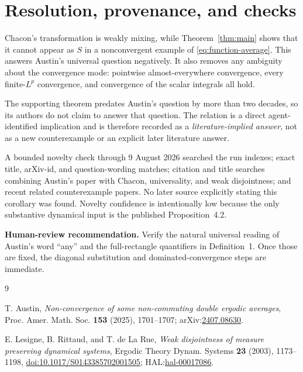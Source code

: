 \documentclass[11pt]{article}
\begin{document}
\section{Resolution, provenance, and checks}

Chacon's transformation is weakly mixing, while Theorem~\ref{thm:main} shows
that it cannot appear as $S$ in a nonconvergent example of
\eqref{eq:function-average}.  This answers Austin's universal question
negatively.  It also removes any ambiguity about the convergence mode:
pointwise almost-everywhere convergence, every finite-$L^p$ convergence, and
convergence of the scalar integrals all hold.

The supporting theorem predates Austin's question by more than two decades,
so its authors do not claim to answer that question.  The relation is a direct
agent-identified implication and is therefore recorded as a
\emph{literature-implied answer}, not as a new counterexample or an explicit
later literature answer.

A bounded novelty check through 9 August 2026 searched the run indexes; exact
title, arXiv-id, and question-wording matches; citation and title searches
combining Austin's paper with Chacon, universality, and weak disjointness; and
recent related counterexample papers.  No later source explicitly stating
this corollary was found.  Novelty confidence is intentionally low because the
only substantive dynamical input is the published Proposition~4.2.

\textbf{Human-review recommendation.}  Verify the natural universal reading
of Austin's word ``any'' and the full-rectangle quantifiers in Definition~1.
Once those are fixed, the diagonal substitution and dominated-convergence
steps are immediate.

\begin{thebibliography}{9}

T. Austin,
\emph{Non-convergence of some non-commuting double ergodic averages},
Proc. Amer. Math. Soc. \textbf{153} (2025), 1701--1707;
arXiv:\href{https://arxiv.org/abs/2407.08630}{2407.08630}.

E. Lesigne, B. Rittaud, and T. de La Rue,
\emph{Weak disjointness of measure preserving dynamical systems},
Ergodic Theory Dynam. Systems \textbf{23} (2003), 1173--1198,
\href{https://doi.org/10.1017/S0143385702001505}{doi:10.1017/S0143385702001505};
HAL:\href{https://hal.science/hal-00017086}{hal-00017086}.

\end{thebibliography}
\end{document}
